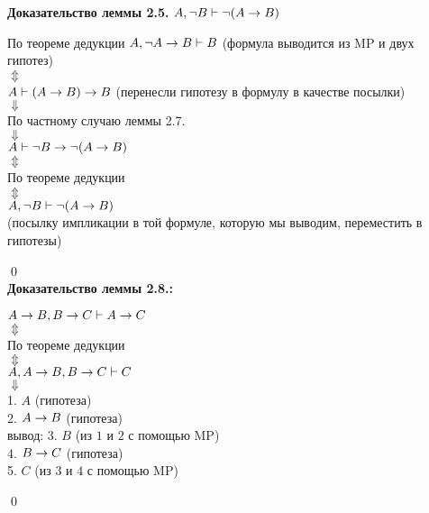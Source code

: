 \textbf{Доказательство леммы 2.5.} $A, \neg B \vdash \neg (A\rightarrow B)$\\
\begin{center}
По теореме дедукции $A, \neg A \rightarrow B \vdash B$ (формула выводится из MP и двух гипотез) \\
$\Updownarrow$\\
$ A \vdash (A\rightarrow B)\rightarrow B$ (перенесли гипотезу в формулу в качестве посылки)\\
$\Downarrow$ \\
По частному случаю леммы 2.7. \\
$\Downarrow$\\
$A \vdash \neg B \rightarrow \neg (A\rightarrow B)$\\
$\Updownarrow$\\
По теореме дедукции\\
$\Updownarrow$\\
$A, \neg B \vdash \neg (A\rightarrow B)$\\ (посылку импликации в той формуле, которую мы выводим, переместить в гипотезы)
\end{center}
\qed\\
\newpage
\textbf{Доказательство леммы 2.8.:} 
\begin{center}
$A\rightarrow B, B\rightarrow C \vdash A \rightarrow C$\\
$\Updownarrow$\\
По теореме дедукции\\
$\Updownarrow$\\
$A, A\rightarrow B, B\rightarrow C \vdash C$\\
$\Downarrow$\\
\hspace{32mm} 1. $A$ (гипотеза)\\
\hspace{42mm} 2. $A\rightarrow B$ (гипотеза) \\
\hspace{20mm} вывод: \hspace{26mm} 3. $B$ (из $1$ и $2$ с помощью MP)\\
\hspace{43mm} 4. $B\rightarrow C$ (гипотеза) \\
\hspace{62mm} 5. $C$ (из $3$ и $4$ с помощью MP) \\
\end{center}
\qed

